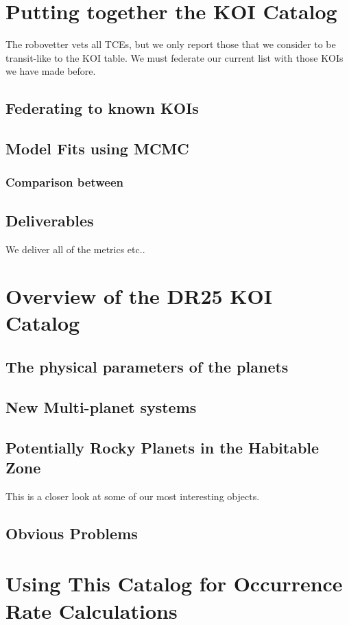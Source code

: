 \documentclass[onecolumn]{aastex6}
\begin{document}
\section{Putting together the KOI Catalog}
The robovetter vets all TCEs, but we only report those that we consider to be transit-like to the KOI table. We must federate our current list with those KOIs we have made before.
\subsection{Federating to known KOIs}

\subsection{Model Fits using MCMC}

\subsubsection{Comparison between }
\subsection{Deliverables}
We deliver all of the metrics etc..

\section{Overview of the DR25 KOI Catalog}
\subsection{The physical parameters of the planets}
\subsection{New Multi-planet systems}
\subsection{Potentially Rocky Planets in the Habitable Zone}
This is a closer look at some of our most interesting objects.
\subsection{Obvious Problems}

\section{Using This Catalog for Occurrence Rate Calculations}
\end{document}
